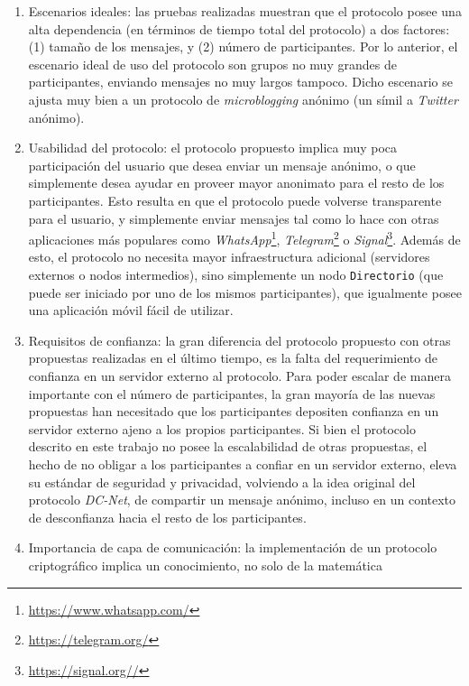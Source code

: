\begin{enumerate}
    \item Escenarios ideales: las pruebas realizadas muestran que el protocolo 
    posee una alta dependencia (en términos de tiempo total del protocolo) a 
    dos factores: (1) tamaño de los mensajes, y (2) número de participantes. 
    Por lo anterior, el escenario ideal de uso del protocolo son grupos no muy 
    grandes de participantes, enviando mensajes no muy largos tampoco. Dicho 
    escenario se ajusta muy bien a un protocolo de \emph{microblogging} 
    anónimo (un símil a \emph{Twitter} anónimo).
    \item Usabilidad del protocolo: el protocolo propuesto implica muy poca 
    participación del usuario que desea enviar un mensaje anónimo, o que 
    simplemente desea ayudar en proveer mayor anonimato para el resto de los 
    participantes. Esto resulta en que el protocolo puede volverse 
    transparente para el usuario, y simplemente enviar mensajes tal como lo 
    hace con otras aplicaciones más populares como 
    \emph{WhatsApp}\footnote{\url{https://www.whatsapp.com/}}, 
    \emph{Telegram}\footnote{\url{https://telegram.org/}} o 
    \emph{Signal}\footnote{\url{https://signal.org//}}. 
    Además de esto, el protocolo no necesita mayor infraestructura adicional 
    (servidores externos o nodos intermedios), sino simplemente un nodo 
    \texttt{Directorio} (que puede ser iniciado por uno de los mismos 
    participantes), que igualmente posee una aplicación móvil fácil de 
    utilizar.
    \item Requisitos de confianza: la gran diferencia del protocolo propuesto 
    con otras propuestas realizadas en el último tiempo, es la falta del 
    requerimiento de confianza en un servidor externo al protocolo. Para poder 
    escalar de manera importante con el número de participantes, la gran 
    mayoría de las nuevas propuestas han necesitado que los participantes 
    depositen confianza en un servidor externo ajeno a los propios 
    participantes. Si bien el protocolo descrito en este trabajo no posee la 
    escalabilidad de otras propuestas, el hecho de no obligar a los 
    participantes a confiar en un servidor externo, eleva su estándar de 
    seguridad y privacidad, volviendo a la idea original del protocolo 
    \emph{DC-Net}, de compartir un mensaje anónimo, incluso en un contexto de 
    desconfianza hacia el resto de los participantes. 
    \item Importancia de capa de comunicación: la implementación de un 
    protocolo criptográfico implica un conocimiento, no solo de la matemática 

\end{enumerate}
